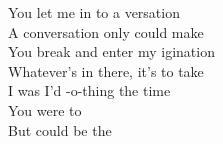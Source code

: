 \songwordfb{} You let me in to a versation \\
\songwordfb{} A conversation only  could make \\
\songwordfb{} You break and enter my igination \\
\songwordfb{} Whatever's in there, it's  to take \\

I was  I'd  
-o-thing the  time \\
You were  to  \\
But  could be the  \\